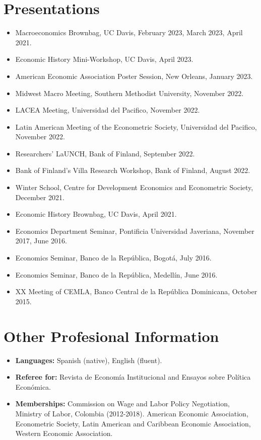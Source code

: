 \documentclass{res}
\begin{document}
\begin{normalsize}
\section{Presentations}
\begin{itemize}
\item Macroeconomics Brownbag, UC Davis,  February 2023,  March 2023, April 2021.
\item Economic History Mini-Workshop, UC Davis, April 2023.
\item American Economic Association Poster Session, New Orleans, January 2023.
\item Midwest Macro Meeting, Southern Methodist University, November 2022.
\item LACEA Meeting,  Universidad del Pacifico, November 2022.
\item Latin American Meeting of the Econometric Society,  Universidad del Pacifico, November 2022.
\item Researchers' LaUNCH, Bank of Finland, September 2022.
\item Bank of Finland's Villa Research Workshop, Bank of Finland, August 2022.
\item Winter School, Centre for Development Economics and Econometric Society, December 2021. 
\item Economic History Brownbag, UC Davis, April 2021.
\item Economics Department Seminar, Pontificia Universidad Javeriana, November 2017, June 2016.
\item Economics Seminar, Banco de la Rep\'{u}blica, Bogot\'{a}, July 2016.
\item Economics Seminar, Banco de la Rep\'{u}blica, Medell\'{i}n, June 2016.
\item XX Meeting of CEMLA, Banco Central de la Rep\'{u}blica Dominicana, October 2015.
\end{itemize}

\section{\textbf{Other Profesional Information}}
\begin{itemize}

\item \textbf{Languages:} Spanish (native), English (fluent).
\item \textbf{Referee for:} Revista de Econom\'{i}a Institucional and Ensayos sobre Pol\'{i}tica Econ\'{o}mica.
\item \textbf{Memberships:} Commission on Wage and Labor Policy Negotiation, Ministry of Labor, Colombia (2012-2018). American Economic Association, Econometric Society, Latin American and Caribbean Economic Association, Western Economic Association.
\end{itemize}


\end{normalsize}
\end{document}
